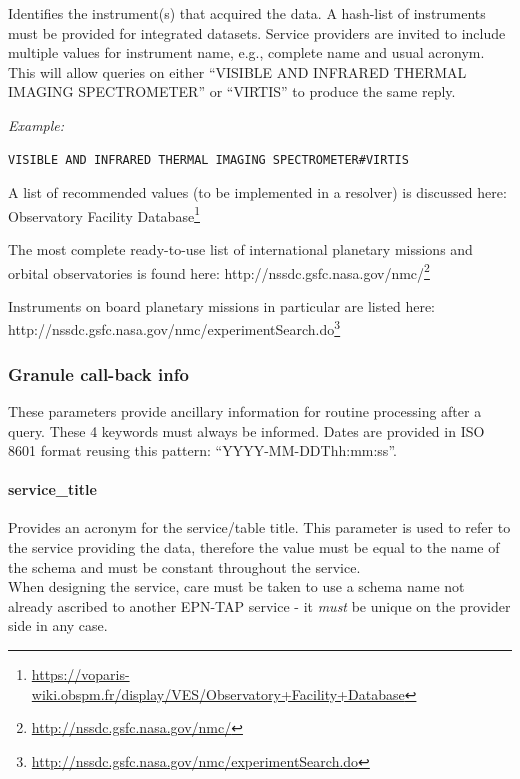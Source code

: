 \documentclass[11pt,a4paper]{ivoa}
\begin{document}
Identifies the instrument(s) that acquired the data. A hash-list of instruments must be provided for integrated datasets. Service providers are invited to include multiple values for instrument name, e.g., complete name and usual acronym. This will allow queries on either ``VISIBLE AND INFRARED THERMAL IMAGING SPECTROMETER'' or ``VIRTIS'' to produce the same reply. 

\emph{\emph{Example:}}

\begin{verbatim}
VISIBLE AND INFRARED THERMAL IMAGING SPECTROMETER#VIRTIS
\end{verbatim}

A list of recommended values (to be implemented in a resolver) is discussed here: Observatory Facility Database\footnote{\url{https://voparis-wiki.obspm.fr/display/VES/Observatory+Facility+Database}}

The most complete ready-to-use list of international planetary missions and orbital observatories is found here: http://nssdc.gsfc.nasa.gov/nmc/\footnote{\url{http://nssdc.gsfc.nasa.gov/nmc/}}

Instruments on board planetary missions in particular are listed here: \\http://nssdc.gsfc.nasa.gov/nmc/experimentSearch.do\footnote{\url{http://nssdc.gsfc.nasa.gov/nmc/experimentSearch.do}}

\subsubsection{Granule call-back info}

These parameters provide ancillary information for routine processing after a query. These 4 keywords must always be informed. Dates are provided in ISO 8601 format reusing this pattern: “YYYY-MM-DDThh:mm:ss”. 

\paragraph{service\_title}

Provides an acronym for the service/table title. This parameter is used to refer to the service providing the data, therefore the value must be equal to the name of the schema and must be constant throughout the service.\\When designing the service, care must be taken to use a schema name not already ascribed to another EPN-TAP service - it \emph{must} be unique on the provider side in any case.
\end{document}

